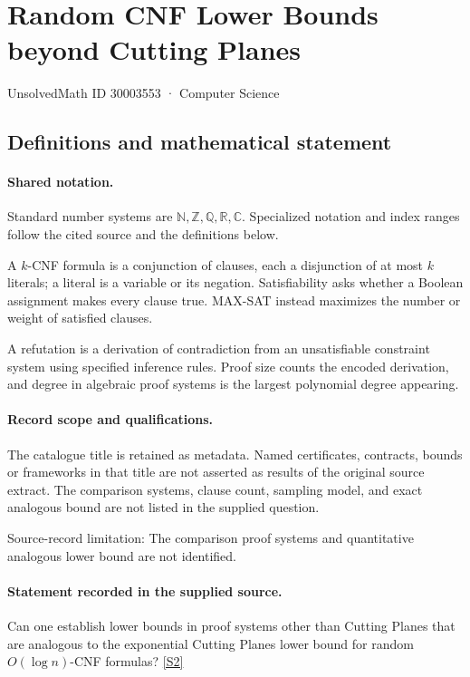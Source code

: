 \documentclass[11pt]{article}
\newcommand{\sref}[2]{\hyperlink{source:#1:#2}{[S#2]}}
\begin{document}
\setcounter{section}{30003552}
\section{Random CNF Lower Bounds beyond Cutting Planes}\label{30003553}
{\small\sffamily UnsolvedMath ID 30003553 · Computer Science}
\subsection{Definitions and mathematical statement}

\paragraph{Shared notation.}Standard number systems are $\mathbb N,\mathbb Z,\mathbb Q,\mathbb R,\mathbb C$. Specialized notation and index ranges follow the cited source and the definitions below.


A $k$-CNF formula is a conjunction of clauses, each a disjunction of at most $k$ literals; a literal is a variable or its negation. Satisfiability asks whether a Boolean assignment makes every clause true. MAX-SAT instead maximizes the number or weight of satisfied clauses.

A refutation is a derivation of contradiction from an unsatisfiable constraint system using specified inference rules. Proof size counts the encoded derivation, and degree in algebraic proof systems is the largest polynomial degree appearing.
\paragraph{Record scope and qualifications.}
The catalogue title is retained as metadata. Named certificates, contracts, bounds or frameworks in that title are not asserted as results of the original source extract.
The comparison systems, clause count, sampling model, and exact analogous bound are not listed in the supplied question.

Source-record limitation: The comparison proof systems and quantitative analogous lower bound are not identified.
\paragraph{Statement recorded in the supplied source.}
Can one establish lower bounds in proof systems other than Cutting Planes that are analogous to the exponential Cutting Planes lower bound for random $O(\log n)$-CNF formulas? \sref{30003553}{2}
\end{document}

